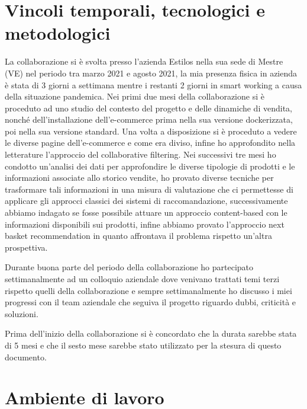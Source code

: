 \section{Vincoli temporali, tecnologici e metodologici}
La collaborazione si è svolta presso l'azienda Estilos nella sua sede di Mestre (VE) nel periodo tra marzo 2021 e agosto 2021, la mia presenza fisica in azienda è stata di 3 giorni a settimana mentre i restanti 2 giorni in smart working a causa della situazione pandemica. 
Nei primi due mesi della collaborazione si è proceduto ad uno studio del contesto del progetto e delle dinamiche di vendita, nonché dell'installazione dell'e-commerce prima nella sua versione dockerizzata, poi nella sua versione standard. Una volta a disposizione si è proceduto a vedere le diverse pagine dell'e-commerce e come era diviso, infine ho approfondito nella letterature l'approccio del collaborative filtering.
Nei successivi tre mesi ho condotto un'analisi dei dati per approfondire le diverse tipologie di prodotti e le informazioni associate allo storico vendite, ho provato diverse tecniche per trasformare tali informazioni in una misura di valutazione che ci permettesse di applicare gli approcci classici dei sistemi di raccomandazione, successivamente abbiamo indagato se fosse possibile attuare un approccio content-based con le informazioni disponibili sui prodotti, infine abbiamo provato l'approccio next basket recommendation in quanto affrontava il problema rispetto un'altra prospettiva.

Durante buona parte del periodo della collaborazione ho partecipato settimanalmente ad un colloquio aziendale dove venivano trattati temi terzi rispetto quelli della collaborazione e sempre settimanalmente ho discusso i miei progressi con il team aziendale che seguiva il progetto riguardo dubbi, criticità e soluzioni.

Prima dell'inizio della collaborazione si è concordato che la durata sarebbe stata di 5 mesi e che il sesto mese sarebbe stato utilizzato per la stesura di questo documento. 

\section{Ambiente di lavoro}
